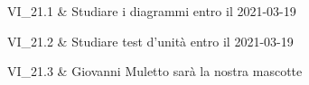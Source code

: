 VI\_21.1 & Studiare i diagrammi entro il 2021-03-19

\tabularnewline
VI\_21.2 & Studiare test d'unità entro il 2021-03-19

\tabularnewline
VI\_21.3 & Giovanni Muletto sarà la nostra mascotte
